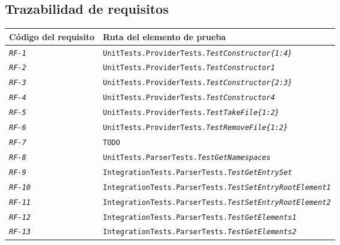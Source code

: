     \subsection{Trazabilidad de requisitos}
        \begin{longtable}{|| M{3cm} | M{12cm} ||} 
                \hline
                    Código del requisito & Ruta del elemento de prueba \\
                \hline\hline
                    \texttt{\textit{RF-1}} & \texttt{UnitTests.ProviderTests.\textit{TestConstructor\{1:4\}}} \\ 
                \hline
                    \texttt{\textit{RF-2}} & \texttt{UnitTests.ProviderTests.\textit{TestConstructor1}} \\
                \hline
                    \texttt{\textit{RF-3}} & \texttt{UnitTests.ProviderTests.\textit{TestConstructor\{2:3\}}} \\
                \hline
                    \texttt{\textit{RF-4}} & \texttt{UnitTests.ProviderTests.\textit{TestConstructor4}} \\
                \hline
                    \texttt{\textit{RF-5}} & \texttt{UnitTests.ProviderTests.\textit{TestTakeFile\{1:2\}}} \\
                \hline
                    \texttt{\textit{RF-6}} & \texttt{UnitTests.ProviderTests.\textit{TestRemoveFile\{1:2\}}} \\
                \hline
                    \texttt{\textit{RF-7}} & \texttt{TODO} \\
                \hline
                    \texttt{\textit{RF-8}} & \texttt{UnitTests.ParserTests.\textit{TestGetNamespaces}} \\
                \hline
                    \texttt{\textit{RF-9}} & \texttt{IntegrationTests.ParserTests.\textit{TestGetEntrySet}} \\
                \hline
                    \texttt{\textit{RF-10}} & \texttt{IntegrationTests.ParserTests.\textit{TestSetEntryRootElement1}} \\
                \hline
                    \texttt{\textit{RF-11}} & \texttt{IntegrationTests.ParserTests.\textit{TestSetEntryRootElement2}} \\
                \hline
                    \texttt{\textit{RF-12}} & \texttt{IntegrationTests.ParserTests.\textit{TestGetElements1}} \\
                \hline
                    \texttt{\textit{RF-13}} & \texttt{IntegrationTests.ParserTests.\textit{TestGetElements2}} \\

\end{longtable}
